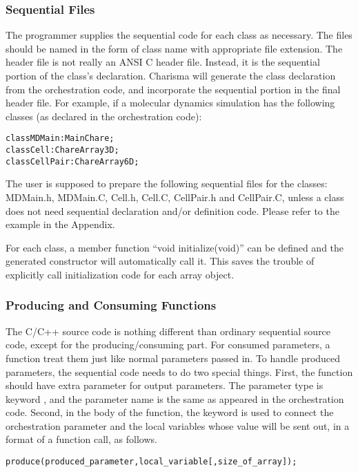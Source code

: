 \subsubsection{Sequential Files}
The programmer supplies the sequential code for each class as necessary. The
files should be named in the form of class name with appropriate file extension.
The header file is not really an ANSI C header file. Instead, it is the
sequential portion of the class's declaration. Charisma will generate the class 
declaration from the orchestration code, and incorporate the sequential portion
in the final header file. For example, if a molecular dynamics simulation has
the following classes (as declared in the orchestration code):

\begin{alltt}
    class MDMain : MainChare;
    class Cell : ChareArray3D;
    class CellPair : ChareArray6D;
\end{alltt}

The user is supposed to prepare the following sequential files for the classes:
MDMain.h, MDMain.C, Cell.h, Cell.C, CellPair.h and CellPair.C, unless a class
does not need sequential declaration and/or definition code. Please refer to the
example in the Appendix. 

For each class, a member function ``void initialize(void)'' can be defined and
the generated constructor will automatically call it. This saves the trouble of 
explicitly call initialization code for each array object. 

\subsubsection{Producing and Consuming Functions}
The C/C++ source code is nothing different than ordinary sequential source code,
except for the producing/consuming part. For consumed parameters, a function
treat them just like normal parameters passed in. To handle produced parameters, 
the sequential code needs to do two special things. First, the function should 
have extra parameter for output parameters. The parameter type is keyword ,
and the parameter name is the same as appeared in the orchestration code. Second,
in the body of the function, the keyword  is used to connect the 
orchestration parameter and the local variables whose value will be sent out, in 
a format of a function call, as follows.

\begin{alltt}
    produce(produced\_parameter, local\_variable[, size\_of\_array]);
\end{alltt}

